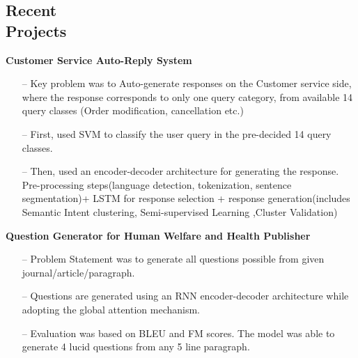 \documentclass[margin,line]{templates/resume}
\newcommand{\myhref}[3][blue]{\href{#2}{\color{#1}{#3}}}
\newcommand{\compresslist}{%
\setlength{\itemsep}{3pt}%
\setlength{\parskip}{0pt}%
\setlength{\parsep}{0pt}%
}
\begin{document}
\begin{resume}
\section{\mysidestyle Recent\\Projects}
\textsf{\textbf{Customer Service Auto-Reply System}} \hfill{\myhref[darkblue]{https://esha-singh.github.io/\#mpi}{Web}}
\vspace{0.05cm}
\begin{itemize}[leftmargin=*]\compresslist
 \item[--] Key problem was to Auto-generate responses on the Customer service side, where the response corresponds to only one query category, from available 14 query classes (Order modification, cancellation etc.) 
 \item[--] First, used SVM to classify the user query in the pre-decided 14 query classes.
 \item[--] Then, used an encoder-decoder architecture for generating the response. Pre-processing steps(language detection, tokenization, sentence segmentation)+ LSTM for response selection + response generation(includes Semantic Intent clustering, Semi-supervised Learning ,Cluster Validation)
\vspace{0.05cm}  
\end{itemize}

\vspace{-0.1cm}    
\textsf{\textbf{Question Generator for Human Welfare and Health Publisher}} \hfill{\myhref[darkblue]{https://esha-singh.github.io/\#mpi}{Web}}
\vspace{0.05cm}
\begin{itemize}[leftmargin=*]\compresslist
\item[--]Problem Statement was to generate all questions possible from given journal/article/paragraph.
\item[--]Questions are generated using an RNN encoder-decoder architecture while adopting the global attention mechanism.
\item[--]Evaluation was based on BLEU and FM scores. The model was able to generate 4 lucid questions from any 5 line paragraph.
\end{itemize}


\end{resume}
\end{document}
